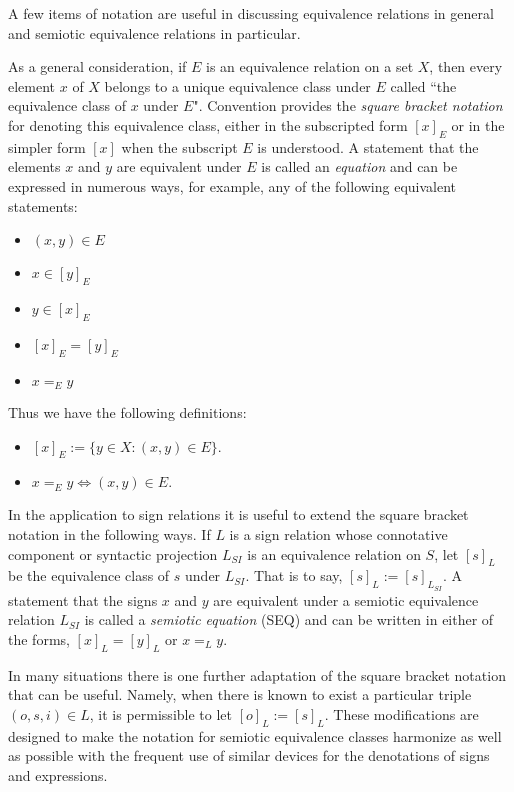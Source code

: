 \documentclass[12pt]{article}
\begin{document}
A few items of notation are useful in discussing equivalence relations in general and semiotic equivalence relations in particular.

As a general consideration, if $E$ is an equivalence relation on a set $X$, then every element $x$ of $X$ belongs to a unique equivalence class under $E$ called ``the equivalence class of $x$ under $E$".  Convention provides the \textit{square bracket notation} for denoting this equivalence class, either in the subscripted form $[x]_E$ or in the simpler form $[x]$ when the subscript $E$ is understood.  A statement that the elements $x$ and $y$ are equivalent under $E$ is called an \textit{equation} and can be expressed in numerous ways, for example, any of the following equivalent statements:

\begin{itemize}
\item
$(x, y) \in E$
\item
$x \in [y]_E$
\item
$y \in [x]_E$
\item
$[x]_E = [y]_E$
\item
$x =_E y$
\end{itemize}

Thus we have the following definitions:

\begin{itemize}
\item
$[x]_E := \{ y \in X : (x, y) \in E \}.$
\item
$x =_E y \iff (x, y) \in E.$
\end{itemize}

In the application to sign relations it is useful to extend the square bracket notation in the following ways.  If $L$ is a sign relation whose connotative component or syntactic projection $L_{SI}$ is an equivalence relation on $S$, let $[s]_L$ be the equivalence class of $s$ under $L_{SI}$.  That is to say, $[s]_L := [s]_{L_{SI}}$.  A statement that the signs $x$ and $y$ are equivalent under a semiotic equivalence relation $L_{SI}$ is called a \textit{semiotic equation} (SEQ) and can be written in either of the forms, $[x]_L = [y]_L$ or $x =_L y$.

In many situations there is one further adaptation of the square bracket notation that can be useful.  Namely, when there is known to exist a particular triple $(o, s, i) \in L$, it is permissible to let $[o]_L := [s]_L$.  These modifications are designed to make the notation for semiotic equivalence classes harmonize as well as possible with the frequent use of similar devices for the denotations of signs and expressions.
\end{document}
